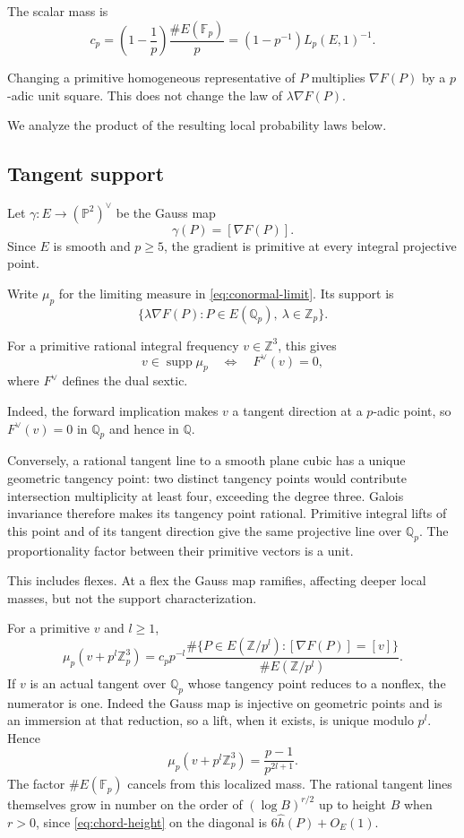 \documentclass[11pt]{article}
\begin{document}
The scalar mass is
\begin{equation}\label{eq:hasse-mass}
\boxed{
c_p=
\left(1-\frac1p\right)
\frac{\#E(\mathbb F_p)}p
=
(1-p^{-1})L_p(E,1)^{-1}.}
\end{equation}

Changing a primitive homogeneous representative
of $P$ multiplies $\nabla F(P)$ by a
$p$-adic unit square. This does not change
the law of $\lambda\nabla F(P)$.

We analyze the product of the resulting local probability laws below.

\subsection{Tangent support}

Let $\gamma:E\to(\mathbb P^2)^\vee$ be
the Gauss map
\[
\gamma(P)=[\nabla F(P)].
\]
Since $E$ is smooth and $p\ge5$, the
gradient is primitive at every integral
projective point.

Write $\mu_p$ for the limiting measure in \eqref{eq:conormal-limit}. Its support is
\[
\{\lambda\nabla F(P):
P\in E(\mathbb Q_p),\
\lambda\in\mathbb Z_p\}.
\]

For a primitive rational integral frequency
$v\in\mathbb Z^3$, this gives
\begin{equation}\label{eq:rational-tangent}
\boxed{
v\in\operatorname{supp}\mu_p
\quad\Longleftrightarrow\quad
F^\vee(v)=0,}
\end{equation}
where $F^\vee$ defines the dual sextic.

Indeed, the forward implication makes
$v$ a tangent direction at a $p$-adic point,
so $F^\vee(v)=0$ in $\mathbb Q_p$ and hence
in $\mathbb Q$.

Conversely, a rational tangent line to
a smooth plane cubic has a unique geometric
tangency point: two distinct tangency points
would contribute intersection multiplicity
at least four, exceeding the degree three.
Galois invariance therefore makes its
tangency point rational.
Primitive integral lifts of this point and of its tangent direction give the same projective line over $\mathbb Q_p$. The proportionality factor between their primitive vectors is a unit.

This includes flexes. At a flex the Gauss
map ramifies, affecting deeper local masses,
but not the support characterization.

For a primitive $v$ and $l\ge1$,
\[
\mu_p(v+p^l\mathbb Z_p^3)
=
c_pp^{-l}
\frac{
\#\{P\in E(\mathbb Z/p^l):
[\nabla F(P)]=[v]\}
}{
\#E(\mathbb Z/p^l)
}.
\]
If $v$ is an actual tangent over $\mathbb Q_p$ whose tangency point reduces to a nonflex, the numerator is one. Indeed the Gauss map is injective on geometric points and is an immersion at that reduction, so a lift, when it exists, is unique modulo $p^l$.
Hence
\[
\boxed{
\mu_p(v+p^l\mathbb Z_p^3)
=\frac{p-1}{p^{2l+1}}.}
\]
The factor $\#E(\mathbb F_p)$ cancels
from this localized mass. The rational tangent lines themselves grow in number on the order of $(\log B)^{r/2}$ up to height $B$ when $r>0$, since \eqref{eq:chord-height} on the diagonal is $6\hat h(P)+O_E(1)$.
\end{document}
